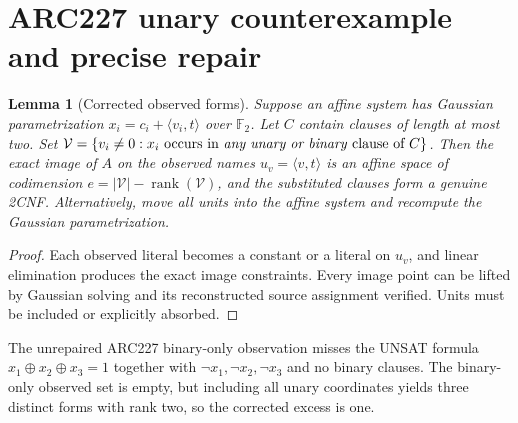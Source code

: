 \documentclass[11pt]{article}
\newtheorem{lemma}[theorem]{Lemma}
\begin{document}
\section{ARC227 unary counterexample and precise repair}
\begin{lemma}[Corrected observed forms]
Suppose an affine system has Gaussian parametrization
$x_i=c_i+\langle v_i,t\rangle$ over $\mathbb F_2$.
Let $C$ contain clauses of length at most two.
Set $\mathcal V=\{v_i\ne0:x_i\text{ occurs in \emph{any unary or binary} clause of }C\}$.
Then the exact image of $A$ on the observed names $u_v=\langle v,t\rangle$
is an affine space of codimension
$e=|\mathcal V|-\operatorname{rank}(\mathcal V)$, and the
substituted clauses form a genuine 2CNF.
Alternatively, move all units into the affine system and recompute the Gaussian parametrization.
\end{lemma}
\begin{proof}
Each observed literal becomes a constant or a literal on $u_v$,
and linear elimination produces the exact image constraints.
Every image point can be lifted by Gaussian solving and its reconstructed
source assignment verified. Units must be included or explicitly absorbed.
\end{proof}
The unrepaired ARC227 binary-only observation misses the UNSAT formula
$x_1\oplus x_2\oplus x_3=1$ together with $\neg x_1,\neg x_2,\neg x_3$
and no binary clauses. The binary-only observed set is empty,
but including all unary coordinates yields three distinct forms with rank two,
so the corrected excess is one.
\end{document}
